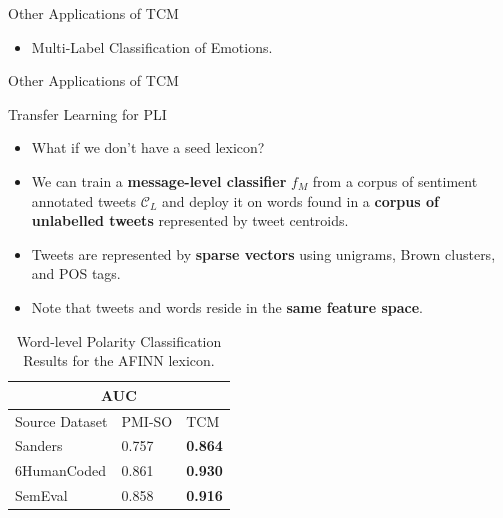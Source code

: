 \documentclass[handout]{beamer}
\begin{document}
\begin{frame}{Other Applications of TCM}
\begin{scriptsize}
\begin{itemize}
\item  Multi-Label Classification of Emotions.
\end{itemize}

\begin{figure}[htbp]
\begin{center}
\end{center}
\end{figure}

\end{scriptsize}
\end{frame}

\begin{frame}{Other Applications of TCM}
\begin{scriptsize}
\begin{block}{Transfer Learning for PLI}
\begin{itemize}
 \item What if we don't have a seed lexicon?
 \item We can train a \textbf{message-level classifier} $f_M$ from a corpus of sentiment annotated tweets $\mathcal{C}_L$ and deploy it on words found in a \textbf{corpus of unlabelled tweets} represented by tweet centroids.
 \item Tweets are represented by  \textbf{sparse vectors} using unigrams, Brown clusters, and POS tags.
 \item Note that tweets and words reside in the \textbf{same feature space}.

 \end{itemize}

\begin{table}[htbp]
\begin{tabular}{l|ll}
\hline \hline
\multicolumn{3}{c}{AUC} \\
\hline \hline
Source Dataset & PMI-SO & TCM  \\ \hline
Sanders & 0.757 &  \textbf{0.864} \\ 
6HumanCoded & 0.861 & \textbf{0.930}  \\ 
SemEval & 0.858 & \textbf{0.916}   \\ \hline
\end{tabular}
\caption{Word-level Polarity Classification Results for the AFINN lexicon.}
\end{table}
\end{block}

\en
\end{scriptsize}
\end{frame}
\end{document}
